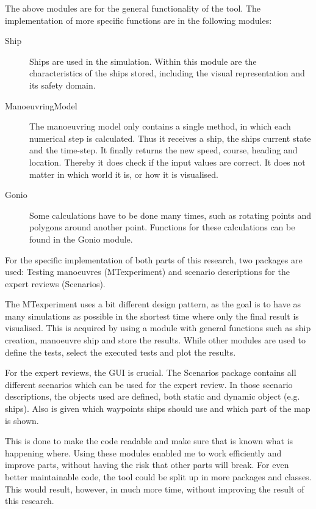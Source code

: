The above modules are for the general functionality of the tool. The implementation of more specific functions are in the following modules:
\begin{description}
	\item[Ship] Ships are used in the simulation. Within this module are the characteristics of the ships stored, including the visual representation and its safety domain.
	\item[ManoeuvringModel] The manoeuvring model only contains a single method, in which each numerical step is calculated. Thus it receives a ship, the ships current state and the time-step. It finally returns the new speed, course, heading and location. Thereby it does check if the input values are correct. It does not matter in which world it is, or how it is visualised.
	\item[Gonio] Some calculations have to be done many times, such as rotating points and polygons around another point. Functions for these calculations can be found in the Gonio module.
\end{description}


For the specific implementation of both parts of this research, two packages are used: Testing manoeuvres (MTexperiment) and scenario descriptions for the expert reviews (Scenarios). 

The MTexperiment uses a bit different design pattern, as the goal is to have as many simulations as possible in the shortest time where only the final result is visualised. This is acquired by using a module with general functions such as ship creation, manoeuvre ship and store the results. While other modules are used to define the tests, select the executed tests and plot the results. 

For the expert reviews, the GUI is crucial. The Scenarios package contains all different scenarios which can be used for the expert review. In those scenario descriptions, the objects used are defined, both static and dynamic object (e.g. ships). Also is given which waypoints ships should use and which part of the map is shown.

This is done to make the code readable and make sure that is known what is happening where. Using these modules enabled me to work efficiently and improve parts, without having the risk that other parts will break. For even better maintainable code, the tool could be split up in more packages and classes. This would result, however, in much more time, without improving the result of this research.

